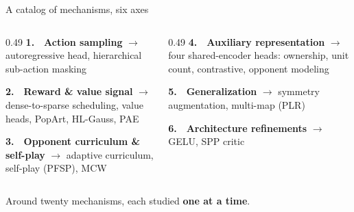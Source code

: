 \documentclass[aspectratio=169,11pt]{beamer}
\begin{document}
\begin{frame}{A catalog of mechanisms, six axes}
  \small
  \vfill
  \begin{columns}[t]
    \begin{column}{0.49\textwidth}
      {\color{uclAccent}\bfseries 1.}~~{\color{uclBlue}\bfseries Action sampling}\newline
      {\scriptsize\color{black!55}$\rightarrow$ autoregressive head, hierarchical sub-action masking}\par\vspace{1.25em}
      {\color{uclAccent}\bfseries 2.}~~{\color{uclBlue}\bfseries Reward \& value signal}\newline
      {\scriptsize\color{black!55}$\rightarrow$ dense-to-sparse scheduling, value heads, PopArt, HL-Gauss, PAE}\par\vspace{1.25em}
      {\color{uclAccent}\bfseries 3.}~~{\color{uclBlue}\bfseries Opponent curriculum \& self-play}\newline
      {\scriptsize\color{black!55}$\rightarrow$ adaptive curriculum, self-play (PFSP), MCW}\par
    \end{column}
    \begin{column}{0.49\textwidth}
      {\color{uclAccent}\bfseries 4.}~~{\color{uclBlue}\bfseries Auxiliary representation}\newline
      {\scriptsize\color{black!55}$\rightarrow$ four shared-encoder heads: ownership, unit count, contrastive, opponent modeling}\par\vspace{1.25em}
      {\color{uclAccent}\bfseries 5.}~~{\color{uclBlue}\bfseries Generalization}\newline
      {\scriptsize\color{black!55}$\rightarrow$ symmetry augmentation, multi-map (PLR)}\par\vspace{1.25em}
      {\color{uclAccent}\bfseries 6.}~~{\color{uclBlue}\bfseries Architecture refinements}\newline
      {\scriptsize\color{black!55}$\rightarrow$ GELU, SPP critic}\par
    \end{column}
  \end{columns}
  \vfill
  \begin{center}{\footnotesize\color{black!55}Around twenty mechanisms, each studied \textbf{\color{uclBlue}one at a time}.}\end{center}
\end{frame}
\end{document}
